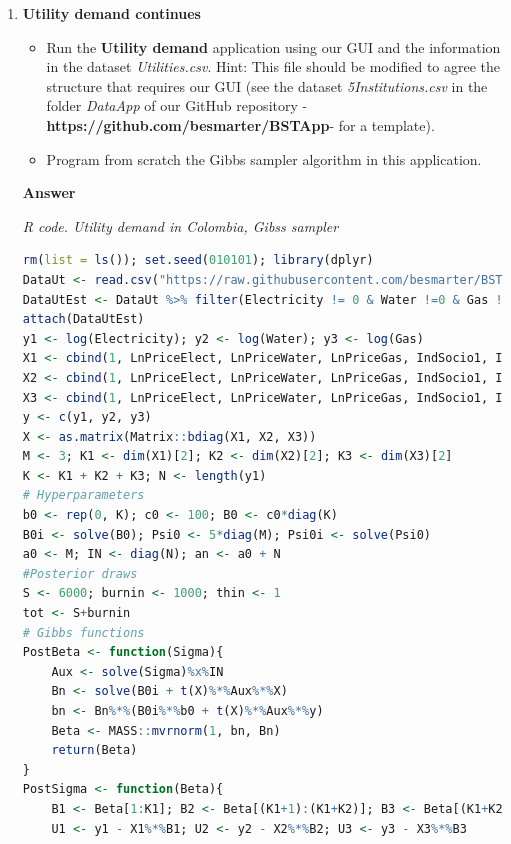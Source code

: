\begin{enumerate}[leftmargin=*]
\item \textbf{Utility demand continues}

\begin{itemize}
	\item Run the \textbf{Utility demand} application using our GUI and the information in the dataset \textit{Utilities.csv}. Hint: This file should be modified to agree the structure that requires our GUI (see the dataset \textit{5Institutions.csv} in the folder \textit{DataApp} of our GitHub repository -\textbf{https://github.com/besmarter/BSTApp}- for a template).
	\item Program from scratch the Gibbs sampler algorithm in this application.   
\end{itemize}

\textbf{Answer}

\begin{tcolorbox}[enhanced,width=4.67in,center upper,
	fontupper=\large\bfseries,drop shadow southwest,sharp corners]
	\textit{R code. Utility demand in Colombia, Gibss sampler}
	\begin{VF}
		\begin{lstlisting}[language=R]
rm(list = ls()); set.seed(010101); library(dplyr)
DataUt <- read.csv("https://raw.githubusercontent.com/besmarter/BSTApp/refs/heads/master/DataApp/Utilities.csv", sep = ",", header = TRUE, quote = "")
DataUtEst <- DataUt %>% filter(Electricity != 0 & Water !=0 & Gas != 0)
attach(DataUtEst)
y1 <- log(Electricity); y2 <- log(Water); y3 <- log(Gas)
X1 <- cbind(1, LnPriceElect, LnPriceWater, LnPriceGas, IndSocio1, IndSocio2, Altitude, Nrooms, HouseholdMem, Lnincome)
X2 <- cbind(1, LnPriceElect, LnPriceWater, LnPriceGas, IndSocio1, IndSocio2, Nrooms, HouseholdMem)
X3 <- cbind(1, LnPriceElect, LnPriceWater, LnPriceGas, IndSocio1, IndSocio2, Altitude, Nrooms, HouseholdMem)
y <- c(y1, y2, y3)
X <- as.matrix(Matrix::bdiag(X1, X2, X3))
M <- 3; K1 <- dim(X1)[2]; K2 <- dim(X2)[2]; K3 <- dim(X3)[2] 
K <- K1 + K2 + K3; N <- length(y1)
# Hyperparameters
b0 <- rep(0, K); c0 <- 100; B0 <- c0*diag(K)
B0i <- solve(B0); Psi0 <- 5*diag(M); Psi0i <- solve(Psi0)
a0 <- M; IN <- diag(N); an <- a0 + N
#Posterior draws
S <- 6000; burnin <- 1000; thin <- 1
tot <- S+burnin
# Gibbs functions
PostBeta <- function(Sigma){
	Aux <- solve(Sigma)%x%IN
	Bn <- solve(B0i + t(X)%*%Aux%*%X)
	bn <- Bn%*%(B0i%*%b0 + t(X)%*%Aux%*%y)
	Beta <- MASS::mvrnorm(1, bn, Bn)
	return(Beta)
}
PostSigma <- function(Beta){
	B1 <- Beta[1:K1]; B2 <- Beta[(K1+1):(K1+K2)]; B3 <- Beta[(K1+K2+1):(K1+K2+K3)]
	U1 <- y1 - X1%*%B1; U2 <- y2 - X2%*%B2; U3 <- y3 - X3%*%B3

\end{lstlisting}
\end{VF}
\end{tcolorbox}
\end{enumerate}

